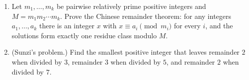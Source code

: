 \begin{enumerate}
\item[(a)] Let $m_1,\dots,m_k$ be pairwise relatively prime positive integers and $M=m_1m_2\cdots m_k$. Prove the Chinese remainder theorem: for any integers $a_1,\dots,a_k$ there is an integer $x$ with $x\equiv a_i\pmod{m_i}$ for every $i$, and the solutions form exactly one residue class modulo $M$.
\item[(b)] (Sunzi's problem.) Find the smallest positive integer that leaves remainder $2$ when divided by $3$, remainder $3$ when divided by $5$, and remainder $2$ when divided by $7$.
\end{enumerate}
